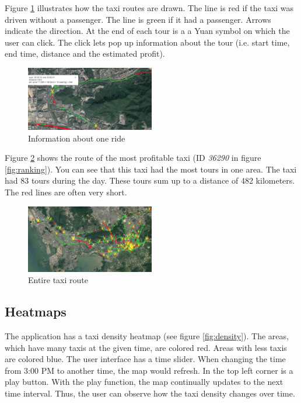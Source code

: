 \documentclass[10pt]{sig-alternate}
\begin{document}
Figure \ref{fig:single_ride} illustrates how the taxi routes are drawn. The line is red if the taxi was driven without a passenger. The line is green if it had a passenger. Arrows indicate the direction. At the end of each tour is a a Yuan symbol on which the user can click. The click lets pop up information about the tour (i.e. start time, end time, distance and the estimated profit).\\

\begin{figure}[ht]
\centering
\includegraphics[width=0.5\textwidth]{img/single_ride.png}
\caption{Information about one ride}
\label{fig:single_ride}
\end{figure}

Figure \ref{fig:best_taxi} shows the route of the most profitable taxi (ID \textit{36290} in figure \ref{fig:ranking}). You can see that this taxi had the most tours in one area. The taxi had 83 tours during the day. These tours sum up to a distance of 482 kilometers. The red lines are often very short.

\begin{figure}[ht]
\centering
\includegraphics[width=0.5\textwidth]{img/best_taxi.png}
\caption{Entire taxi route}
\label{fig:best_taxi}
\end{figure}

\subsection{Heatmaps}
\label{sec:heatmaps}

The application has a taxi density heatmap (see figure \ref{fig:density}). The areas, which have many taxis at the given time, are colored red. Areas with less taxis are colored blue. The user interface has a time slider. When changing the time from 3:00 PM to another time, the map would refresh. In the top left corner is a play button. With the play function, the map continually updates to the next time interval. Thus, the user can observe how the taxi density changes over time.
\end{document}
